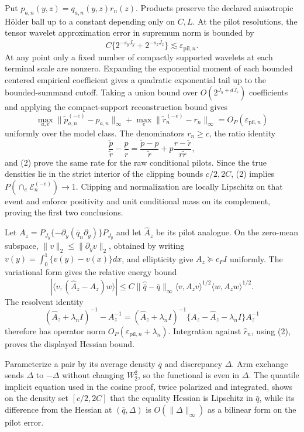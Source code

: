 Put \(p_{a,n}(y,z)=q_{a,n}(y,z)r_n(z)\). Products preserve the declared anisotropic H\"older ball up to a constant depending only on \(C,L\). At the pilot resolutions, the tensor wavelet approximation error in supremum norm is bounded by
\[
C\{2^{-s_y\bar J_y}+2^{-s_z\bar J_z}\}\lesssim\varepsilon_{\mathrm{pil},n}. \tag{1}
\]
At any point only a fixed number of compactly supported wavelets at each terminal scale are nonzero. Expanding the exponential moment of each bounded centered empirical coefficient gives a quadratic exponential tail up to the bounded-summand cutoff. Taking a union bound over \(O(2^{\bar J_y+d\bar J_z})\) coefficients and applying the compact-support reconstruction bound gives
\[
\max_{a,e}\|\widetilde p_{a,n}^{(-e)}-p_{a,n}\|_\infty
+\max_e\|\widetilde r_n^{(-e)}-r_n\|_\infty
=O_P(\varepsilon_{\mathrm{pil},n})                     \tag{2}
\]
uniformly over the model class. The denominators \(r_n\ge c\), the ratio identity
\[
\frac{\widetilde p}{\widetilde r}-\frac p r
=\frac{\widetilde p-p}{\widetilde r}
+p\frac{r-\widetilde r}{r\widetilde r},               \tag{3}
\]
and (2) prove the same rate for the raw conditional pilots. Since the true densities lie in the strict interior of the clipping bounds \(c/2,2C\), (2) implies \(P(\cap_e\mathcal E_n^{(-e)})\to1\). Clipping and normalization are locally Lipschitz on that event and enforce positivity and unit conditional mass on its complement, proving the first two conclusions.

Let \(A_z=P_{J_y}\{-\partial_y(\bar q_n\partial_y)\}P_{J_y}\) and let \(\widehat A_z\) be its pilot analogue. On the zero-mean subspace, \(\|v\|_2\le\|\partial_yv\|_2\), obtained by writing \(v(y)=\int_0^1\{v(y)-v(x)\}dx\), and ellipticity give \(A_z\succeq c_PI\) uniformly. The variational form gives the relative energy bound
\[
|\langle v,(\widehat A_z-A_z)w\rangle|
\le C\|\widehat{\bar q}-\bar q\|_\infty
\langle v,A_zv\rangle^{1/2}\langle w,A_zw\rangle^{1/2}.
\]
The resolvent identity
\[
(\widehat A_z+\lambda_nI)^{-1}-A_z^{-1}
=(\widehat A_z+\lambda_nI)^{-1}
\{A_z-\widehat A_z-\lambda_nI\}A_z^{-1}              \tag{4}
\]
therefore has operator norm \(O_P(\varepsilon_{\mathrm{pil},n}+\lambda_n)\). Integration against \(\widehat r_n\), using (2), proves the displayed Hessian bound.

Parameterize a pair by its average density \(\bar q\) and discrepancy \(\Delta\). Arm exchange sends \(\Delta\) to \(-\Delta\) without changing \(W_2^2\), so the functional is even in \(\Delta\). The quantile implicit equation used in the cosine proof, twice polarized and integrated, shows on the density set \([c/2,2C]\) that the equality Hessian is Lipschitz in \(\bar q\), while its difference from the Hessian at \((\bar q,\Delta)\) is \(O(\|\Delta\|_\infty)\) as a bilinear form on the pilot error.


